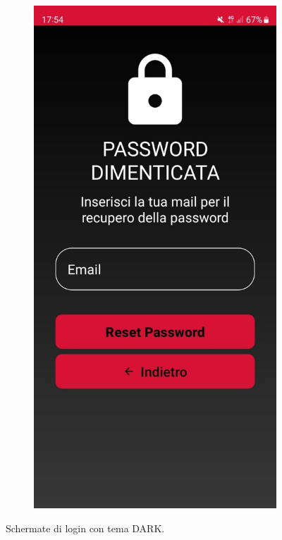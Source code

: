 \begin{figure}[ht]
\begin{subfigure}[b]{0.3\textwidth}
    \includegraphics[width=\textwidth, height=0.4\textheight]{Immagini/App/pw_dimenticata_scuro.jpeg}
  \end{subfigure}
  \caption{Schermate di login con tema DARK.}
  \label{fig:dark1}
\end{figure}

